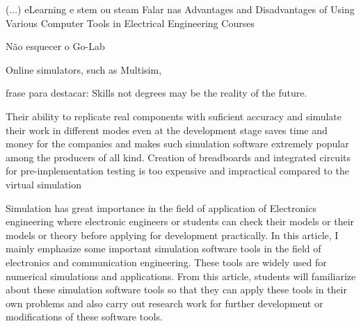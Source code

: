 



\vspace{1cm}


(...)
eLearning e stem ou steam
Falar nas Advantages and Disadvantages of Using Various Computer Tools in Electrical Engineering Courses
\vspace{1cm}

Não esquecer o Go-Lab
\vspace{1cm}


Online simulators, such as Multisim, 



\vspace{1cm}

frase para destacar: Skills not degrees may be the reality of the future.
\vspace{1cm}

Their ability to replicate real components with suficient accuracy and simulate their work in diﬀerent modes even at the development stage saves time and money for the companies and makes such simulation software extremely popular among the producers of all kind. Creation of breadboards and integrated circuits for pre-implementation testing is too expensive and impractical compared to the virtual simulation
\vspace{1cm}

Simulation has great importance in the field of application of Electronics engineering where electronic engineers or students  can  check  their  models  or  their  models  or  theory  before  applying  for  development practically. In this article, I mainly emphasize some important simulation software tools in the field of electronics and communication engineering. These tools are widely used for numerical simulations and applications. From this article, students will familiarize about these simulation software tools so that they can apply these tools in their own problems and also carry out research work for further development or modifications of these software tools. 

